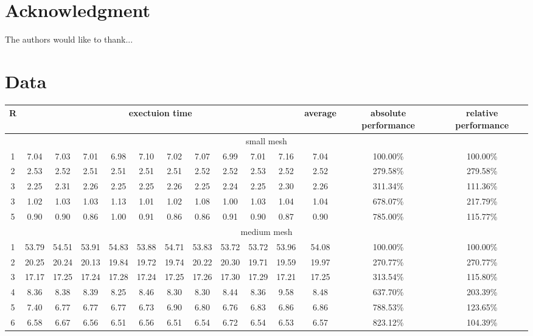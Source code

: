 \documentclass[conference]{IEEEtran}
\begin{document}
\section*{Acknowledgment}


The authors would like to thank...


\section*{Data}
\begin{sidewaystable}
\centering
\begin{tabular}{ |c|c|c|c|c|c|c|c|c|c|c|c|c|c| }
  \hline
  R & \multicolumn{10}{|c|}{exectuion time} & average & absolute performance & relative performance \\
  \hline \hline
  \multicolumn{14}{|c|}{small mesh} \\ \hline
1 & 7.04 &  7.03 &  7.01 &  6.98 &  7.10 &  7.02 &  7.07 &  6.99 &  7.01 &  7.16 &  7.04 &  100.00\% & 100.00\% \\ \hline
2 & 2.53 &  2.52 &  2.51 &  2.51 &  2.51 &  2.51 &  2.52 &  2.52 &  2.53 &  2.52 &  2.52 &  279.58\% & 279.58\% \\ \hline
3 & 2.25 &  2.31 &  2.26 &  2.25 &  2.25 &  2.26 &  2.25 &  2.24 &  2.25 &  2.30 &  2.26 &  311.34\% & 111.36\% \\ \hline
3 & 1.02 &  1.03 &  1.03 &  1.13 &  1.01 &  1.02 &  1.08 &  1.00 &  1.03 &  1.04 &  1.04 &  678.07\% & 217.79\% \\ \hline
5 & 0.90 &  0.90 &  0.86 &  1.00 &  0.91 &  0.86 &  0.86 &  0.91 &  0.90 &  0.87 &  0.90 &  785.00\% & 115.77\% \\ \hline
\hline
\multicolumn{14}{|c|}{medium mesh} \\ \hline                        
1 & 53.79 & 54.51 & 53.91 & 54.83 & 53.88 & 54.71 & 53.83 & 53.72 & 53.72 & 53.96 & 54.08 & 100.00\% & 100.00\% \\ \hline
2 & 20.25 & 20.24 & 20.13 & 19.84 & 19.72 & 19.74 & 20.22 & 20.30 & 19.71 & 19.59 & 19.97 & 270.77\% & 270.77\% \\ \hline
3 & 17.17 & 17.25 & 17.24 & 17.28 & 17.24 & 17.25 & 17.26 & 17.30 & 17.29 & 17.21 & 17.25 & 313.54\% & 115.80\% \\ \hline
4 & 8.36 &  8.38 &  8.39 &  8.25 &  8.46 &  8.30 &  8.30 &  8.44 &  8.36 &  9.58 &  8.48 & 637.70\% & 203.39\% \\ \hline
5 & 7.40 &  6.77 &  6.77 &  6.77 &  6.73 &  6.90 &  6.80 &  6.76 &  6.83 &  6.86 &  6.86 & 788.53\% & 123.65\% \\ \hline
6 & 6.58 &  6.67 & 6.56 & 6.51 & 6.56 & 6.51 & 6.54 & 6.72 & 6.54 & 6.53 & 6.57 & 823.12\% & 104.39\% \\ \hline
\end{tabular}
\end{sidewaystable}
\end{document}
